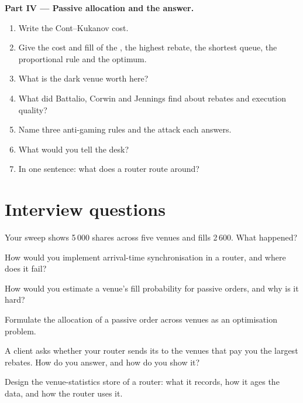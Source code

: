 \begin{problem}
\medskip\noindent\textbf{Part IV --- Passive allocation and the answer.}
\begin{enumerate}[resume]
\item Write the Cont--Kukanov cost.
\item Give the cost and fill of the , the highest rebate, the shortest queue, the proportional rule and the optimum.
\item What is the dark venue worth here?
\item What did Battalio, Corwin and Jennings find about rebates and execution quality?
\item Name three anti-gaming rules and the attack each answers.
\item What would you tell the desk?
\item In one sentence: what does a router route around?
\end{enumerate}
\end{problem}

\section{Interview questions}

\begin{interviewq}\label{iq:mx:smart-order-routing:1}
Your sweep shows 5\,000 shares across five venues and fills 2\,600. What happened?
\end{interviewq}

\begin{interviewq}\label{iq:mx:smart-order-routing:2}
How would you implement arrival-time synchronisation in a router, and where does it fail?
\end{interviewq}

\begin{interviewq}\label{iq:mx:smart-order-routing:3}
How would you estimate a venue's fill probability for passive orders, and why is it hard?
\end{interviewq}

\begin{interviewq}\label{iq:mx:smart-order-routing:4}
Formulate the allocation of a passive order across venues as an optimisation problem.
\end{interviewq}

\begin{interviewq}\label{iq:mx:smart-order-routing:5}
A client asks whether your router sends its  to the venues that pay you the largest rebates. How do you answer, and how do you show it?
\end{interviewq}

\begin{interviewq}\label{iq:mx:smart-order-routing:6}
Design the venue-statistics store of a router: what it records, how it ages the data, and how the router uses it.
\end{interviewq}
